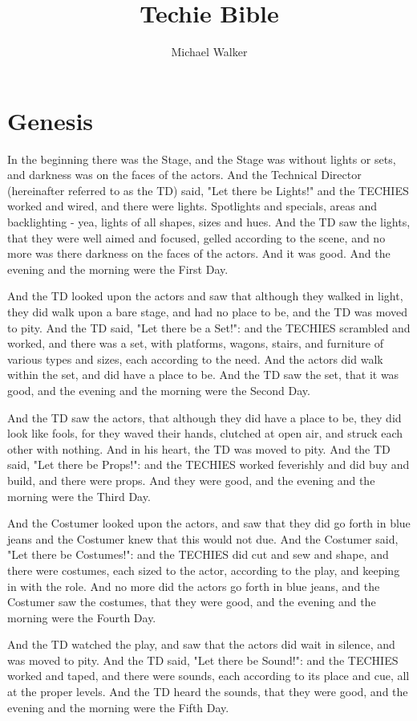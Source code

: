 \documentclass[10pt,a4paper,oneside]{article}
\author{Michael Walker}
\title{Techie Bible}
\begin{document}
\maketitle{}

\section{Genesis}
In the beginning there was the Stage, and the Stage was without lights or sets, and darkness was on the faces of the actors. And the Technical Director (hereinafter referred to as the TD) said, "Let there be Lights!" and the TECHIES worked and wired, and there were lights. Spotlights and specials, areas and backlighting - yea, lights of all shapes, sizes and hues. And the TD saw the lights, that they were well aimed and focused, gelled according to the scene, and no more was there darkness on the faces of the actors. And it was good. And the evening and the morning were the First Day. 

And the TD looked upon the actors and saw that although they walked in light, they did walk upon a bare stage, and had no place to be, and the TD was moved to pity. And the TD said, "Let there be a Set!": and the TECHIES scrambled and worked, and there was a set, with platforms, wagons, stairs, and furniture of various types and sizes, each according to the need. And the actors did walk within the set, and did have a place to be. And the TD saw the set, that it was good, and the evening and the morning were the Second Day. 

And the TD saw the actors, that although they did have a place to be, they did look like fools, for they waved their hands, clutched at open air, and struck each other with nothing. And in his heart, the TD was moved to pity. And the TD said, "Let there be Props!": and the TECHIES worked feverishly and did buy and build, and there were props. And they were good, and the evening and the morning were the Third Day. 

And the Costumer looked upon the actors, and saw that they did go forth in blue jeans and the Costumer knew that this would not due. And the Costumer said, "Let there be Costumes!": and the TECHIES did cut and sew and shape, and there were costumes, each sized to the actor, according to the play, and keeping in with the role. And no more did the actors go forth in blue jeans, and the Costumer saw the costumes, that they were good, and the evening and the morning were the Fourth Day. 

And the TD watched the play, and saw that the actors did wait in silence, and was moved to pity. And the TD said, "Let there be Sound!": and the TECHIES worked and taped, and there were sounds, each according to its place and cue, all at the proper levels. And the TD heard the sounds, that they were good, and the evening and the morning were the Fifth Day. 
\end{document}

